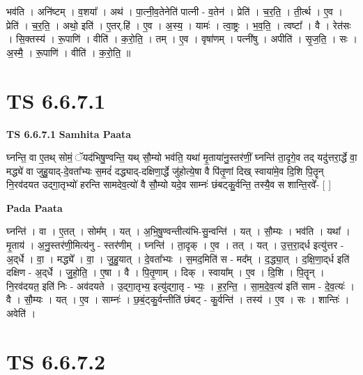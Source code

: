 \documentclass[17pt]{extarticle}
\begin{document}
भव॑ति । अनि॑ष्टम् । व॒शया᳚ । अथ॑ । पा॒त्नी॒व॒तेनेति॑ पात्नी - व॒तेन॑ । प्रेति॑ । च॒र॒ति॒ । ती॒र्त्थ । ए॒व । प्रेति॑ । च॒र॒ति॒ । अथो॒ इति॑ । ए॒तर्.हि॑ । ए॒व । अ॒स्य॒ । यामः॑ । त्वा॒ष्ट्रः । भ॒व॒ति॒ । त्वष्टा᳚ । वै । रेत॑सः । सि॒क्तस्य॑ । रू॒पाणि॑ । वीति॑ । क॒रो॒ति॒ । तम् । ए॒व । वृषा॑णम् । पत्नी॑षु । अपीति॑ । सृ॒ज॒ति॒ । सः । अ॒स्मै॒ । रू॒पाणि॑ । वीति॑ । क॒रो॒ति॒ ॥  \newline




\section*{ TS 6.6.7.1 }

\textbf{TS 6.6.7.1 } \newline
\textbf{Samhita Paata} \newline

घ्नन्ति॒ वा ए॒तथ् सोमं॒ ॅयद॑भिषु॒ण्वन्ति॒ यथ् सौ॒म्यो भव॑ति॒ यथा॑ मृ॒ताया॑नु॒स्तर॑णीं॒ घ्नन्ति॑ ता॒दृगे॒व तद् यदु॑त्तरा॒र्द्धे वा॒ मद्ध्ये॑ वा जुहु॒याद्-दे॒वता᳚भ्यः स॒मदं॑ दद्ध्याद्-दक्षिणा॒र्द्धे जु॑होत्ये॒षा वै पि॑तृ॒णां दिख् स्वाया॑मे॒व दि॒शि पि॒तॄन् नि॒रव॑दयत उद्गा॒तृभ्यो॑ हरन्ति सामदेव॒त्यो॑ वै सौ॒म्यो यदे॒व साम्नः॑ छंबट्कु॒र्वन्ति॒ तस्यै॒व स शान्ति॒रवे᳚- [  ] \newline

\textbf{Pada Paata} \newline

घ्नन्ति॑ । वा । ए॒तत् । सोम᳚म् । यत् । अ॒भि॒षु॒ण्वन्तीत्य॑भि-सु॒न्वन्ति॑ । यत् । सौ॒म्यः । भव॑ति । यथा᳚ । मृ॒ताय॑ । अ॒नु॒स्तर॑णी॒मित्य॑नु - स्तर॑णीम् । घ्नन्ति॑ । ता॒दृक् । ए॒व । तत् । यत् । उ॒त्त॒रा॒द्‌र्ध इत्यु॑त्तर - अ॒द्‌र्धे । वा॒ । मद्ध्ये᳚ । वा॒ । जु॒हु॒यात् । दे॒वता᳚भ्यः । स॒मद॒मिति॑ स - मद᳚म् । द॒द्ध्या॒त् । द॒क्षि॒णा॒द्‌र्ध इति॑ दक्षिण - अ॒द्‌र्धे । जु॒हो॒ति॒ । ए॒षा । वै । पि॒तृ॒णाम् । दिक् । स्वाया᳚म् । ए॒व । दि॒शि । पि॒तॄन् । नि॒रव॑दयत॒ इति॑ निः - अव॑दयते । उ॒द्गा॒तृभ्य॒ इत्यु॑द्गा॒तृ - भ्यः॒ । ह॒र॒न्ति॒ । सा॒म॒दे॒व॒त्य॑ इति॑ साम - दे॒व॒त्यः॑ । वै । सौ॒म्यः । यत् । ए॒व । साम्नः॑ । छ॒बं॒ट्कु॒र्वन्तीति॑ छंबट् - कु॒र्वन्ति॑ । तस्य॑ । ए॒व । सः । शान्तिः॑ । अवेति॑ ।  \newline




\section*{ TS 6.6.7.2 }
\end{document}
